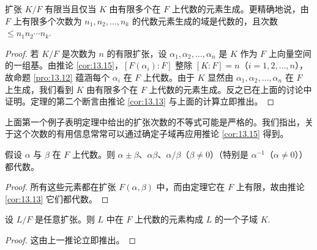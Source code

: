 \begin{theorem}\label{thm:13.17}
扩张 \(K/F\) 有限当且仅当 \(K\) 由有限多个在 \(F\) 上代数的元素生成。更精确地说，由 \(F\) 上有限多个次数为 \(n_1, n_2, \ldots, n_k\) 的代数元素生成的域是代数的，且次数 \(\leq n_1n_2\cdots n_k\).
\end{theorem}

\begin{proof}
若 \(K/F\) 是次数为 \(n\) 的有限扩张，设 \(\alpha_1, \alpha_2, \ldots, \alpha_n\) 是 \(K\) 作为 \(F\) 上向量空间的一组基。由推论 \ref{cor:13.15}，\([F(\alpha_i):F]\) 整除 \([K:F] = n\)（\(i = 1, 2, \ldots, n\)），故命题 \ref{pro:13.12} 蕴涵每个 \(\alpha_i\) 在 \(F\) 上代数。由于 \(K\) 显然由 \(\alpha_1, \alpha_2, \ldots, \alpha_n\) 在 \(F\) 上生成，我们看到 \(K\) 由有限多个在 \(F\) 上代数的元素生成。反之已在上面的讨论中证明。定理的第二个断言由推论 \ref{cor:13.13} 与上面的计算立即推出。
\end{proof}

上面第一个例子表明定理中给出的扩张次数的不等式可能是严格的。我们指出，关于这个次数的有用信息常常可以通过确定子域再应用推论 \ref{cor:13.15} 得到。

\begin{corollary}\label{cor:13.18}
假设 \(\alpha\) 与 \(\beta\) 在 \(F\) 上代数。则 \(\alpha \pm \beta\)、\(\alpha\beta\)、\(\alpha/\beta\)（\(\beta \neq 0\)）（特别是 \(\alpha^{-1}\)（\(\alpha \neq 0\)））都代数。
\end{corollary}

\begin{proof}
所有这些元素都在扩张 \(F(\alpha, \beta)\) 中，而由定理它在 \(F\) 上有限，故由推论 \ref{cor:13.13} 它们都代数。
\end{proof}

\begin{corollary}\label{cor:13.19}
设 \(L/F\) 是任意扩张。则 \(L\) 中在 \(F\) 上代数的元素构成 \(L\) 的一个子域 \(K\).
\end{corollary}

\begin{proof}
这由上一推论立即推出。
\end{proof}

